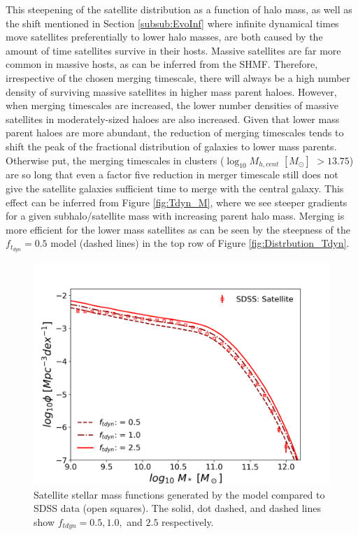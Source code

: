 This steepening of the satellite distribution as a function of halo mass, as well as the shift mentioned in Section \ref{subsub:EvoInf} where infinite dynamical times move satellites preferentially to lower halo masses, are both caused by the amount of time satellites survive in their hosts. Massive satellites are far more common in massive hosts, as can be inferred from the SHMF. Therefore, irrespective of the chosen merging timescale, there will always be a high number density of surviving massive satellites in higher mass parent haloes. However, when merging timescales are increased, the lower number densities of massive satellites in moderately-sized haloes are also increased. Given that lower mass parent haloes are more abundant, the reduction of merging timescales tends to shift the peak of the fractional distribution of galaxies to lower mass parents. Otherwise put, the merging timescales in clusters ($ \log_{10} M_{h,cent}$ $[M_{\odot}]$ $> 13.75$) are so long that even a factor five reduction in merger timescale still does not give the satellite galaxies sufficient time to merge with the central galaxy. This effect can be inferred from Figure \ref{fig:Tdyn_M}, where we see steeper gradients for a given subhalo/satellite mass with increasing parent halo mass. Merging is more efficient for the lower mass satellites as can be seen by the steepness of the $f_{t_{dyn}} = 0.5$ model (dashed lines) in the top row of Figure \ref{fig:Distrbution_Tdyn}.


\begin{figure}[h]
	\centering
	\includegraphics[width = \linewidth]{Figures/Chapter3/Tdyn_SMF.png}
	\caption{Satellite stellar mass functions generated by the model compared to SDSS data (open squares). The solid, dot dashed, and dashed lines show $f_{tdyn} = 0.5, 1.0,$ and $2.5$ respectively.}
	\label{fig:SMF_Tdyn}
\end{figure}

